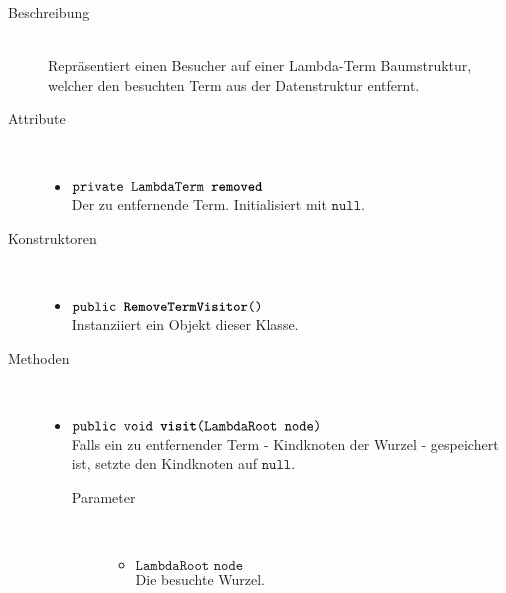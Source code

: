 \begin{description}
\item[Beschreibung] \hfill \\ Repräsentiert einen Besucher auf einer Lambda-Term Baumstruktur, welcher den besuchten Term aus der Datenstruktur entfernt.

\item[Attribute] \hfill \\
	\vspace{-.8cm}
	\begin{itemize}
		\item $\texttt{private LambdaTerm \textbf{removed}}$ \\ Der zu entfernende Term. Initialisiert mit $\texttt{null}$.
	\end{itemize}

\item[Konstruktoren] \hfill \\
	\vspace{-.8cm}
	\begin{itemize}
		\item $\texttt{public \textbf{RemoveTermVisitor}()}$ \\ Instanziiert ein Objekt dieser Klasse.
	\end{itemize}

\item[Methoden] \hfill \\
	\vspace{-.8cm}
	\begin{itemize}
		\item $\texttt{public void \textbf{visit}(LambdaRoot node)}$ \\ Falls ein zu entfernender Term - Kindknoten der Wurzel - gespeichert ist, setzte den Kindknoten auf $\texttt{null}$.
		\begin{description}
			\item[Parameter] \hfill \\
			\vspace{-.8cm}
			\begin{itemize}
				\item $\texttt{LambdaRoot node}$ \\ Die besuchte Wurzel.
			\end{itemize}
		\end{description}
				

\end{itemize}
\end{description}

